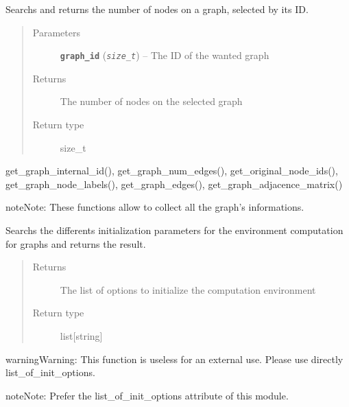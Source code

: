 \documentclass[letterpaper,10pt,english]{sphinxmanual}
\begin{document}
\begin{fulllineitems}
\label{doc:gedlibpy.get_graph_num_nodes}
Searchs and returns the number of nodes on a graph, selected by its ID.
\begin{quote}\begin{description}
\item[{Parameters}] \leavevmode
\textbf{\texttt{graph\_id}} (\emph{\texttt{size\_t}}) -- The ID of the wanted graph

\item[{Returns}] \leavevmode
The number of nodes on the selected graph

\item[{Return type}] \leavevmode
size\_t

\end{description}\end{quote}




get\_graph\_internal\_id(), get\_graph\_num\_edges(), get\_original\_node\_ids(), get\_graph\_node\_labels(), get\_graph\_edges(), get\_graph\_adjacence\_matrix()



\begin{notice}{note}{Note:}
These functions allow to collect all the graph's informations.
\end{notice}

\end{fulllineitems}


\begin{fulllineitems}
\label{doc:gedlibpy.get_init_options}
Searchs the differents initialization parameters for the environment computation for graphs and returns the result.
\begin{quote}\begin{description}
\item[{Returns}] \leavevmode
The list of options to initialize the computation environment

\item[{Return type}] \leavevmode
list{[}string{]}

\end{description}\end{quote}

\begin{notice}{warning}{Warning:}
This function is useless for an external use. Please use directly list\_of\_init\_options.
\end{notice}

\begin{notice}{note}{Note:}
Prefer the list\_of\_init\_options attribute of this module.
\end{notice}

\end{fulllineitems}
\end{document}
